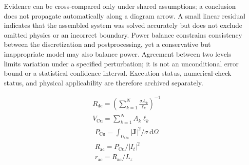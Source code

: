 \documentclass[11pt]{article}
\begin{document}
Evidence can be cross-compared only under shared assumptions; a conclusion does not propagate automatically along a diagram arrow. A small linear residual indicates that the assembled system was solved accurately but does not exclude omitted physics or an incorrect boundary. Power balance constrains consistency between the discretization and postprocessing, yet a conservative but inappropriate model may also balance power. Agreement between two levels limits variation under a specified perturbation; it is not an unconditional error bound or a statistical confidence interval. Execution status, numerical-check status, and physical applicability are therefore archived separately.


\hypertarget{E01}{}
\begin{equation}
\begin{gathered}
R_{\mathrm{dc}}=\left(\sum_{k=1}^{N}\frac{\sigma A_k}{\ell_k}\right)^{-1} \\
V_{\mathrm{Cu}}=\sum_{k=1}^{N}A_k\ell_k
\end{gathered}
\tag{1}\label{eq:E01}
\end{equation}
\hypertarget{E02}{}
\begin{equation}
\begin{gathered}
P_{\mathrm{Cu}}=\int_{\Omega_{\mathrm{Cu}}}|\mathbf J|^2/\sigma\,\mathrm d\Omega \\
R_{\mathrm{ac}}=P_{\mathrm{Cu}}/|I_t|^2 \\
r_{\mathrm{ac}}=R_{\mathrm{ac}}/L_z
\end{gathered}
\tag{2}\label{eq:E02}
\end{equation}
\end{document}
